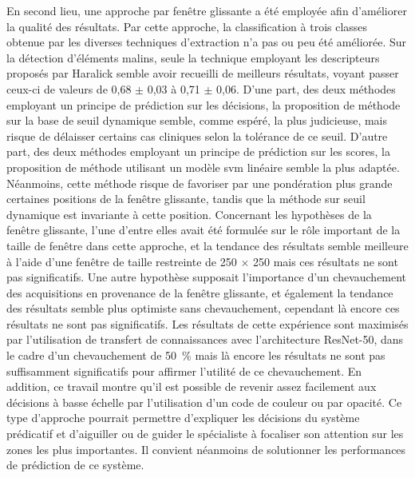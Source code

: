 En second lieu, une approche par fenêtre glissante a été employée afin d'améliorer la qualité des résultats. Par cette approche, la classification à trois classes obtenue par les diverses techniques d'extraction n'a pas ou peu été améliorée. Sur la détection d'éléments malins, seule la technique employant les descripteurs proposés par Haralick semble avoir recueilli de meilleurs résultats, voyant passer ceux-ci de valeurs de \fscore{} 0,68 $\pm$ 0,03 à 0,71 $\pm$ 0,06. D'une part, des deux méthodes employant un principe de prédiction sur les décisions, la proposition de méthode sur la base de seuil dynamique semble, comme espéré, la plus judicieuse, mais risque de délaisser certains cas cliniques selon la tolérance de ce seuil. D'autre part, des deux méthodes employant un principe de prédiction sur les scores, la proposition de méthode utilisant un modèle \gls{svm} linéaire semble la plus adaptée. Néanmoins, cette méthode risque de favoriser par une pondération plus grande certaines positions de la fenêtre glissante, tandis que la méthode sur seuil dynamique est invariante à cette position. Concernant les hypothèses de la fenêtre glissante, l'une d'entre elles avait été formulée sur le rôle important de la taille de fenêtre dans cette approche, et la tendance des résultats semble meilleure à l'aide d’une fenêtre de taille restreinte de 250 $\times$ 250 mais ces résultats ne sont pas significatifs. Une autre hypothèse supposait l'importance d'un chevauchement des acquisitions en provenance de la fenêtre glissante, et également la tendance des résultats semble plus optimiste sans chevauchement, cependant là encore ces résultats ne sont pas significatifs. Les résultats de cette expérience sont maximisés par l'utilisation de transfert de connaissances avec l'architecture ResNet-50, dans le cadre d'un chevauchement de 50~\% mais là encore les résultats ne sont pas suffisamment significatifs pour affirmer l'utilité de ce chevauchement. En addition, ce travail montre qu'il est possible de revenir assez facilement aux décisions à basse échelle par l'utilisation d'un code de couleur ou par opacité. Ce type d'approche pourrait permettre d'expliquer les décisions du système prédicatif et d'aiguiller ou de guider le spécialiste à focaliser son attention sur les zones les plus importantes. Il convient néanmoins de solutionner les performances de prédiction de ce système.\par 

